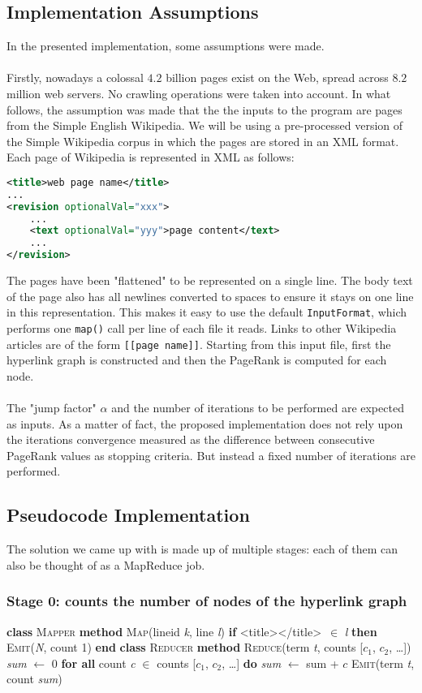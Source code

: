 \documentclass[11pt,a4paper]{article}
\begin{document}
\subsection{Implementation Assumptions}
In the presented implementation, some assumptions were made.\\
\\
Firstly, 
nowadays a colossal $4.2$ billion pages exist on the Web, spread across $8.2$ million web servers. No crawling operations were taken into account. In what follows, the assumption was made that the the inputs to the program are pages from the Simple English Wikipedia. We will be using a pre-processed version of the Simple Wikipedia corpus in which the pages are stored in an XML format. Each page of Wikipedia is represented in XML as follows:
\begin{lstlisting}[language=xml]
<title>web page name</title>
...
<revision optionalVal="xxx">
    ...
    <text optionalVal="yyy">page content</text>
    ...
</revision>
\end{lstlisting}
The pages have been "flattened" to be represented on a single line. The body text of the page also has all newlines converted to spaces to ensure it stays on one line in this representation. This makes it easy to use the default \texttt{InputFormat}, which performs one \texttt{map()} call per line of each file it reads. Links to other Wikipedia articles are of the form \texttt{[[page name]]}. Starting from this input file, first the hyperlink graph is constructed and then the PageRank is computed for each node.\\
\\
The "jump factor" $\alpha$ and the number of iterations to be performed are expected as inputs. As a matter of fact, the proposed implementation does not rely upon the iterations convergence measured as the difference between consecutive PageRank values as stopping criteria. But instead a fixed number of iterations are performed.
\subsection{Pseudocode Implementation}
The solution we came up with is made up of multiple stages: each of them can also be thought of as a MapReduce job.
\subsubsection*{Stage 0: counts the number of nodes of the hyperlink graph}
\begin{algorithm}[H]
\textbf{class} \textsc{Mapper}\;
\Indp\textbf{method} \textsc{Map}(lineid \textit{k}, line \textit{l})\;
\Indp\textbf{if} \textless title\textgreater * \textless /title\textgreater \ $\in$ \textit{l} \textbf{then}\;
\Indp\textsc{Emit}(\textit{N}, count 1)\;
\Indm\textbf{end}\;
\Indm\Indm\;
\textbf{class} \textsc{Reducer}\;
\Indp\textbf{method} \textsc{Reduce}(term \textit{t}, counts [$c_1$, $c_2$, \dots])\;
\Indp\textit{sum} $\leftarrow$ $0$\;
\textbf{for all} count \textit{c} $\in$ counts [$c_1$, $c_2$, \dots] \textbf{do}\;
\Indp\textit{sum} $\leftarrow$ sum + $c$\;
\Indm\textsc{Emit}(term \textit{t}, count \textit{sum})
\end{algorithm}
\end{document}
